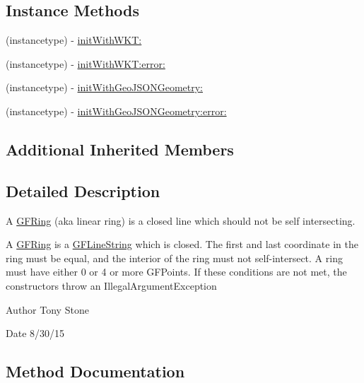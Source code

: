 \subsection*{Instance Methods}
\begin{DoxyCompactItemize}
\item 
(instancetype) -\/ \hyperlink{interface_g_f_ring_a063be826fc24346e1fb5d4830f641ef0}{init\+With\+W\+K\+T\+:}
\item 
(instancetype) -\/ \hyperlink{interface_g_f_ring_a89ebc00785f455c5ca2da11c701ab46e}{init\+With\+W\+K\+T\+:error\+:}
\item 
(instancetype) -\/ \hyperlink{interface_g_f_ring_a3562a7a5b8b37c53de97a0c31981c907}{init\+With\+Geo\+J\+S\+O\+N\+Geometry\+:}
\item 
(instancetype) -\/ \hyperlink{interface_g_f_ring_a99cfb5fc3ca21698e9714e55c9bc394a}{init\+With\+Geo\+J\+S\+O\+N\+Geometry\+:error\+:}
\end{DoxyCompactItemize}
\subsection*{Additional Inherited Members}


\subsection{Detailed Description}
A \hyperlink{interface_g_f_ring}{G\+F\+Ring} (aka linear ring) is a closed line which should not be self intersecting. 

A \hyperlink{interface_g_f_ring}{G\+F\+Ring} is a \hyperlink{interface_g_f_line_string}{G\+F\+Line\+String} which is closed. The first and last coordinate in the ring must be equal, and the interior of the ring must not self-\/intersect. A ring must have either 0 or 4 or more G\+F\+Points. If these conditions are not met, the constructors throw an Illegal\+Argument\+Exception

\begin{DoxyAuthor}{Author}
Tony Stone 
\end{DoxyAuthor}
\begin{DoxyDate}{Date}
8/30/15 
\end{DoxyDate}


\subsection{Method Documentation}
\hypertarget{interface_g_f_ring_a063be826fc24346e1fb5d4830f641ef0}{}

